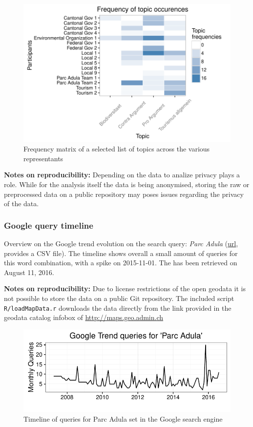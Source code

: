 \documentclass[]{article}
\begin{document}
\begin{figure}[htbp]
\centering
\includegraphics{publication_files/figure-latex/plotfreq-1.pdf}
\caption{Frequency matrix of a selected list of topics across the
various representants}
\end{figure}

\textbf{Notes on reproducibility:} Depending on the data to analize
privacy plays a role. While for the analysis itself the data is being
anonymised, storing the raw or preprocessed data on a public repository
may poses issues regarding the privacy of the data.

\subsubsection{Google query timeline}\label{google-query-timeline}

Overview on the Google trend evolution on the search query: \emph{Parc
Adula}
(\href{https://www.google.com/trends/explore?date=all\&q=parc\%20adula}{url},
provides a CSV file). The timeline shows overall a small amount of
queries for this word combination, with a spike on 2015-11-01. The has
been retrieved on August 11, 2016.

\textbf{Notes on reproducibility:} Due to license restrictions of the
open geodata it is not possible to store the data on a public Git
repository. The included script \texttt{R/loadMapData.r} downloads the
data directly from the link provided in the geodata catalog infobox of
\url{http://maps.geo.admin.ch}

\begin{figure}[htbp]
\centering
\includegraphics{publication_files/figure-latex/googleTrend-1.pdf}
\caption{Timeline of queries for Parc Adula set in the Google search
engine}
\end{figure}
\end{document}

